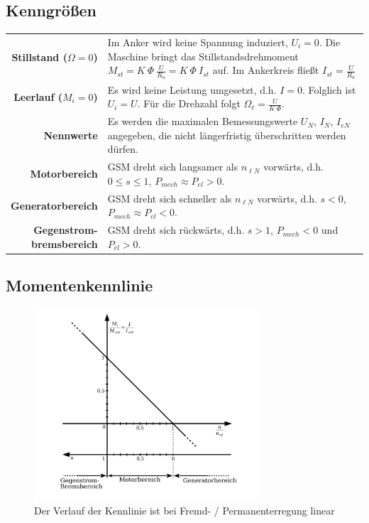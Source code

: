 \documentclass[a4paper, 11pt]{article}
\begin{document}
\subsection*{Kenngrößen}
\begin{center}
\bgroup
\begin{longtable}{r p{12cm}}
	\textbf{Stillstand ($\Omega = 0$)} & Im Anker wird keine Spannung induziert, $U_i = 0$. Die Maschine bringt das Stillstandsdrehmoment $M_{st} = K ~ \Phi ~ \frac{U}{R_a} = K ~ \Phi ~ I_{st}$ auf. Im Ankerkreis fließt $I_{st} = \frac{U}{R_a}$ \\
	\textbf{Leerlauf ($M_i = 0$)} & Es wird keine Leistung umgesetzt, d.h. $I = 0$. Folglich ist $U_i = U$. Für die Drehzahl folgt $\Omega_\ell = \frac{U}{K ~ \Phi}$. \\
	\textbf{Nennwerte} & Es werden die maximalen Bemessungswerte $U_N$, $I_N$, $I_{eN}$ angegeben, die nicht längerfristig überschritten werden dürfen. \\
	\textbf{Motorbereich} & GSM dreht sich langsamer als $n_{\ell N}$ vorwärts, d.h. $0 \leq s \leq 1$, $P_{mech} \approx P_{el} > 0$. \\
	\textbf{Generatorbereich} & GSM dreht sich schneller als $n_{\ell N}$ vorwärts, d.h. $s < 0$, $P_{mech} \approx P_{el} < 0$. \\
	\pbox{20cm}{\textbf{Gegenstrom-} \\ \textbf{bremsbereich}} & GSM dreht sich rückwärts, d.h. $s > 1$, $P_{mech} < 0$ und $P_{el} > 0$.
\end{longtable}
\egroup
\end{center}

\subsection*{Momentenkennlinie}
\begin{figure}[H]
	\centering
	\includegraphics[width=0.75\textwidth]{img/gleichstrommaschine_kennlinie.pdf}
	\caption*{Der Verlauf der Kennlinie ist bei Fremd- / Permanenterregung linear}
\end{figure}
\end{document}
